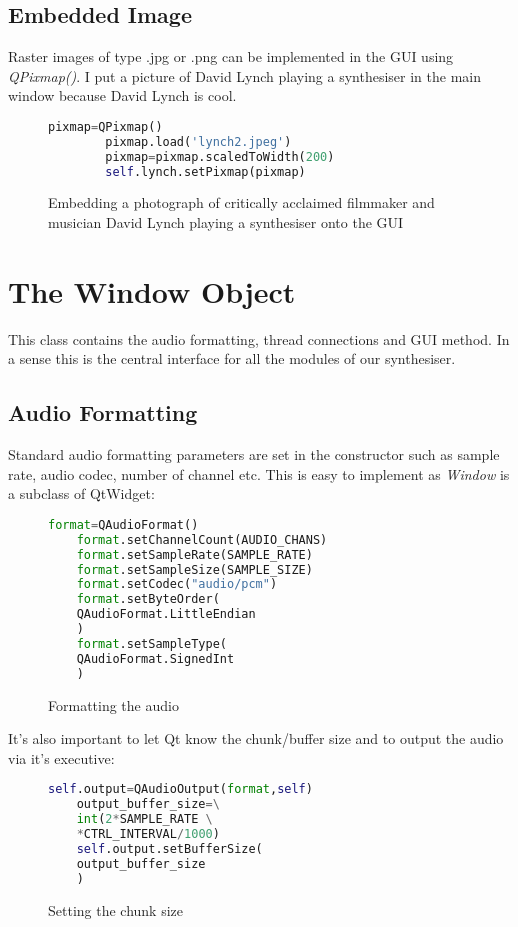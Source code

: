 \documentclass{article}
\begin{document}
\subsection{Embedded Image}
Raster images of type .jpg or .png can be implemented in the GUI using \textit{QPixmap()}. I put a picture of David Lynch playing a synthesiser in the main window because David Lynch is cool.

 \begin{figure}[H]
	\begin{lstlisting}[language=python]
	    pixmap=QPixmap()
	    pixmap.load('lynch2.jpeg')
	    pixmap=pixmap.scaledToWidth(200)
	    self.lynch.setPixmap(pixmap)
	\end{lstlisting}
	\caption{Embedding a photograph of critically acclaimed filmmaker and musician David Lynch playing a synthesiser onto the GUI}
	
\end{figure}
 \pagebreak
 
 
\section{The Window Object}
This class contains the audio formatting, thread connections and GUI method. In a sense this is the central interface for all the modules of our synthesiser.

\subsection{Audio Formatting}
Standard audio formatting parameters are set in the constructor such as sample rate, audio codec, number of channel etc. This is easy to implement as \textit{Window} is a subclass of QtWidget:
 \begin{figure}[H]
	\begin{lstlisting}[language=python]
	format=QAudioFormat()
	format.setChannelCount(AUDIO_CHANS)
	format.setSampleRate(SAMPLE_RATE)
	format.setSampleSize(SAMPLE_SIZE)
	format.setCodec("audio/pcm")
	format.setByteOrder(
	QAudioFormat.LittleEndian
	)
	format.setSampleType(
	QAudioFormat.SignedInt
	)
	\end{lstlisting}
	\caption{Formatting the audio}
	
\end{figure}

It's also important to let Qt know the chunk/buffer size and to output the audio via it's executive:

\begin{figure}[H]
	\begin{lstlisting}[language=python]
	self.output=QAudioOutput(format,self)
	output_buffer_size=\
	int(2*SAMPLE_RATE \
	*CTRL_INTERVAL/1000)
	self.output.setBufferSize(
	output_buffer_size
	)
	\end{lstlisting}
	\caption{Setting the chunk size}
	
\end{figure}
\end{document}
